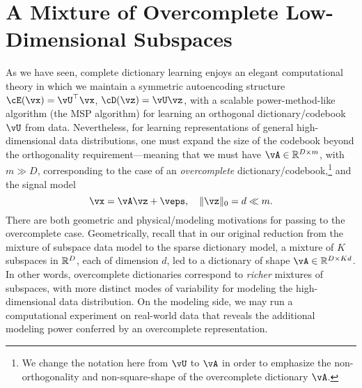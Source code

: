 \documentclass[../../book-main.tex]{subfiles}
\begin{document}
\section{A Mixture of Overcomplete Low-Dimensional Subspaces}
\label{sec:dictionary_learning}
As we have seen, complete dictionary learning enjoys an elegant computational theory in which we maintain a symmetric autoencoding structure $\cE(\vx) = \vU^\top \vx$, $\cD(\vz) = \vU \vz$, with a scalable power-method-like algorithm (the MSP algorithm) for learning an orthogonal dictionary/codebook $\vU$ from data. Nevertheless, for learning representations of general high-dimensional data distributions, one must expand the size of the codebook beyond the orthogonality requirement---meaning that we must have $\vA \in \R^{D \times m}$, with $m \gg D$, corresponding to the case of an \textit{overcomplete} dictionary/codebook,\footnote{We change the notation here from $\vU$ to $\vA$ in order to emphasize the non-orthogonality and non-square-shape of the overcomplete dictionary $\vA$.} and the signal model
\begin{equation}\label{eq:model-DL-overcomplete}
    \vx =  \vA \vz + \veps,
    \quad
    \norm{\vz}_0 = d \ll m.
\end{equation}
There are both geometric and physical/modeling motivations for passing to the overcomplete case. 
Geometrically, recall that in our original reduction from the mixture of subspace data model to the sparse dictionary model, a mixture of $K$ subspaces in $\mathbb{R}^D$, each of dimension $d$, led to a dictionary of shape $\vA \in \R^{D \times Kd}$.
In other words, overcomplete dictionaries correspond to \textit{richer} mixtures of subspaces, with more distinct modes of variability for modeling the high-dimensional data distribution.
On the modeling side, we may run a computational experiment on real-world data that reveals the additional modeling power conferred by an overcomplete representation.
\end{document}
